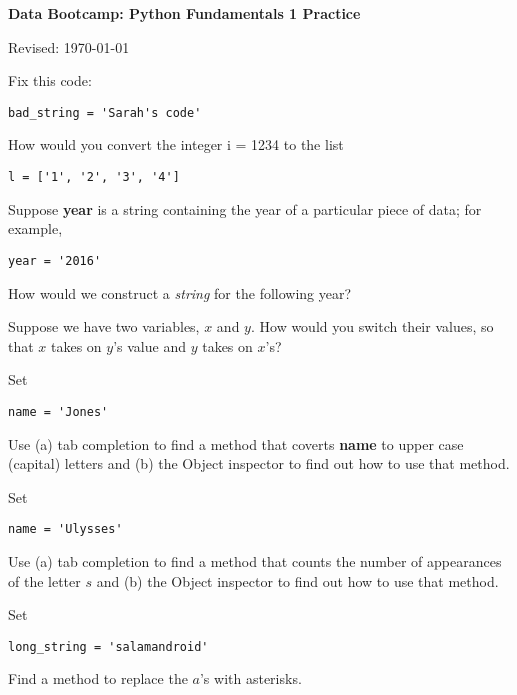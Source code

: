\documentclass[11pt]{exam}
\begin{document}
\parindent=0.0in
\thispagestyle{empty}
%

\bigskip\bigskip
\centerline{\Large \bf Data Bootcamp:  Python Fundamentals 1 Practice}
\centerline{Revised: \today}

\medskip
\vspace{2cm}

\begin{questions}
\item Fix this code:
\begin{verbatim}
bad_string = 'Sarah's code'
\end{verbatim}

\item How would you convert the integer i = 1234 to the list 
\begin{verbatim}
l = ['1', '2', '3', '4']
\end{verbatim}

\item Suppose \textbf{year} is a string containing the year of a particular piece of data; for example, 
\begin{verbatim}
year = '2016'
\end{verbatim}
How would we construct a \emph{string} for the following year?

\item Suppose we have two variables, $x$ and $y$. How would you switch their values, so that $x$ takes on $y$'s value and $y$ takes on $x$'s? 

\item Set 
\begin{verbatim}
name = 'Jones'
\end{verbatim}
Use (a) tab completion to find a method that coverts \textbf{name} to upper case (capital) letters and (b) the Object inspector to find out how to use that method.

\item Set 
\begin{verbatim}
name = 'Ulysses'
\end{verbatim}
Use (a) tab completion to find a method that counts the number of appearances of the letter $s$ and (b) the Object inspector to find out how to use that method.

\item Set
\begin{verbatim}
long_string = 'salamandroid'
\end{verbatim}
Find a method to replace the $a$'s with asterisks.


\end{questions}
\end{document}
